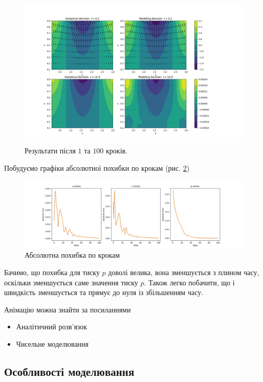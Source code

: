 \documentclass[a4paper,12pt]{article}
\begin{document}
\begin{figure}[h]
	\center \includegraphics[scale=0.5]{Figure_1.png}
	\caption{Результати після $1$ та $100$ кроків.} \label{ris:1}
\end{figure}

Побудуємо графіки абсолютної похибки по крокам (рис. \ref{ris:2})

\begin{figure}[h]
	\center \includegraphics[scale=0.4]{Figure_2.png}
	\caption{Абсолютна похибка по крокам} \label{ris:2}
\end{figure}

Бачимо, що похибка для тиску $p$ доволі велика, вона зменшується з плином часу, оскільки зменшується саме значення тиску $p$. Також легко побачити, що і швидкість зменшується та прямує до нуля із збільшенням часу.

Анімацію можна знайти за посиланнями
\begin{itemize}
	\item Аналітичний розв'язок
	\item Чисельне моделювання
\end{itemize}

\subsection{Особливості моделювання}
\end{document}
